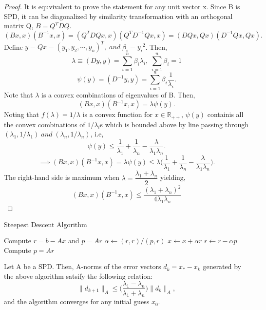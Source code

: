 \documentclass[10pt,a4paper]{article}
\begin{document}
\begin{proof}
It is equvivalent to prove the statement for any unit vector x. Since B is SPD, it can be diagonalized by similarity transformation with an orthogonal matrix Q, $B=Q^TDQ.$
$$(Bx,x)(B^{-1}x,x)=(Q^TDQx,x)(Q^TD^{-1}Qx,x)=(DQx,Qx)(D^{-1}Qx,Qx).$$
Define $y=Qx=(y_1,y_2,\cdots,y_n)^T,\;and\;\beta_i={y_i}^2$. Then,
$$\lambda\equiv (Dy,y) = \sum^n_{i=1}\beta_i\lambda_i,\;\sum^n_{i=1}\beta_i=1$$
$$\psi(y)=(D^{-1}y,y)=\sum^n_{i=1}\beta_i\frac{1}{\lambda_i}.$$
Note that $\lambda$ is a convex combinations of eigenvalues of B. Then,
$$(Bx,x)(B^{-1}x,x)=\lambda\psi(y).$$
Noting that $f(\lambda)=1/{\lambda}$ is a convex function for $x\in\mathbb{R}_{++}$, $\psi(y)$ containis all the convex combinations of $1/\lambda_i$s which is bounded above by line passing through $(\lambda_1,1/{\lambda_1})\;and\;(\lambda_n,1/{\lambda_n})$, i.e,
$$\psi(y)\le \frac{1}{\lambda_1}+\frac{1}{\lambda_n}-\frac{\lambda}{\lambda_1\lambda_n}.$$
$$\implies (Bx,x)(B^{-1}x,x)=\lambda\psi(y)\le \lambda\Big(\frac{1}{\lambda_1}+\frac{1}{\lambda_n}-\frac{\lambda}{\lambda_1\lambda_n}\Big).$$
The right-hand side is maximum when $\lambda=\dfrac{\lambda_1+\lambda_n}{2}$  yielding,
$$(Bx,x)(B^{-1}x,x)\le\frac{(\lambda_1+\lambda_n)^2}{4\lambda_1\lambda_n}$$
\end{proof}

\begin{algorithm}
\caption{Steepest Descent Algorithm}
\begin{algorithmic}[1]
\State Compute $r=b-Ax$ and $p=Ar$
\Repeat
	\State $\alpha\gets (r,r)/(p,r)$
	\State $x\gets x+\alpha r$
	\State $r\gets r-\alpha p$
	\State Compute $p=Ar$
\end{algorithmic}
\end{algorithm}

\begin{theorem}
Let A be a SPD. Then, A-norms of the error vectors $d_k=x_*-x_k$ generated by the above algorithm satsify the following relation:
$$\|d_{k+1}\|_A\le\Big(\frac{\lambda_1-\lambda_n}{\lambda_1+\lambda_n}\Big)\|d_k\|_A,$$
and the algorithm converges for any initial guess $x_0.$
\end{theorem}
\end{document}
